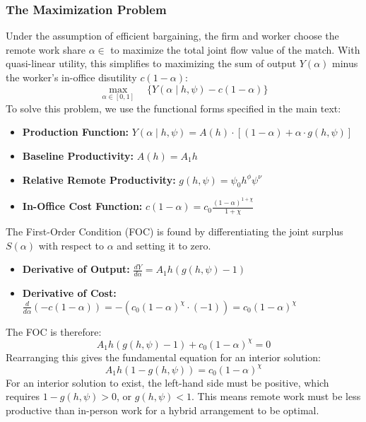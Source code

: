 \documentclass[
  11pt,
  letterpaper,
  DIV=11,
  numbers=noendperiod]{scrartcl}
\providecommand{\tightlist}{%
  \setlength{\itemsep}{0pt}\setlength{\parskip}{0pt}}\usepackage{longtable,booktabs,array}
\begin{document}
\subsubsection{The Maximization Problem}\label{the-maximization-problem}

Under the assumption of efficient bargaining, the firm and worker choose
the remote work share \(\alpha \in\) to maximize the total joint flow
value of the match. With quasi-linear utility, this simplifies to
maximizing the sum of output \(Y(\alpha)\) minus the worker's in-office
disutility \(c(1-\alpha)\): \[
\max_{\alpha \in [0,1]} \quad \Big\{Y(\alpha \mid h, \psi) - c(1-\alpha)\Big\}
\] To solve this problem, we use the functional forms specified in the
main text:

\begin{itemize}
\tightlist
\item
  \textbf{Production Function:}
  \(Y(\alpha \mid h, \psi) = A(h) \cdot \left[(1 - \alpha) + \alpha \cdot g(h, \psi)\right]\)
\item
  \textbf{Baseline Productivity:} \(A(h) = A_1 h\)
\item
  \textbf{Relative Remote Productivity:}
  \(g(h, \psi) = \psi_0 h^{\phi} \psi^{\nu}\)
\item
  \textbf{In-Office Cost Function:}
  \(c(1-\alpha) = c_0 \frac{(1-\alpha)^{1+\chi}}{1+\chi}\)
\end{itemize}

The First-Order Condition (FOC) is found by differentiating the joint
surplus \(S(\alpha)\) with respect to \(\alpha\) and setting it to zero.

\begin{itemize}
\tightlist
\item
  \textbf{Derivative of Output:}
  \(\frac{dY}{d\alpha} = A_1 h (g(h, \psi) - 1)\)
\item
  \textbf{Derivative of Cost:}
  \(\frac{d}{d\alpha} \left( -c(1-\alpha) \right) = - \left( c_0(1-\alpha)^\chi \cdot (-1) \right) = c_0(1-\alpha)^\chi\)
\end{itemize}

The FOC is therefore: \[
A_1 h (g(h, \psi) - 1) + c_0(1-\alpha)^{\chi} = 0
\] Rearranging this gives the fundamental equation for an interior
solution: \[
A_1 h (1 - g(h, \psi)) = c_0(1-\alpha)^{\chi}
\] For an interior solution to exist, the left-hand side must be
positive, which requires \(1 - g(h, \psi) > 0\), or \(g(h, \psi) < 1\).
This means remote work must be less productive than in-person work for a
hybrid arrangement to be optimal.
\end{document}
